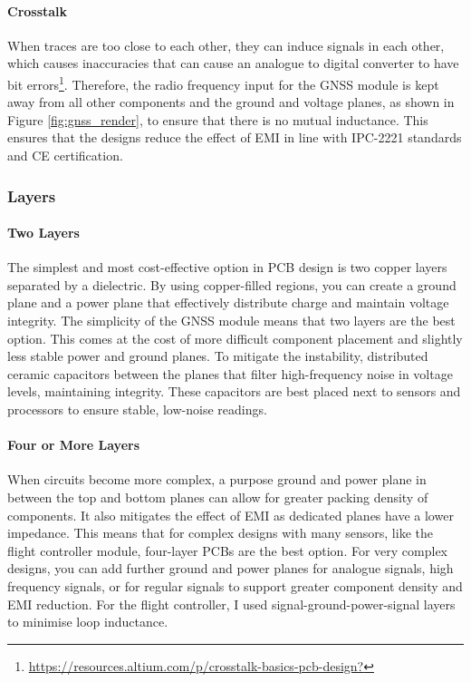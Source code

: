 \paragraph{Crosstalk}
When traces are too close to each other, they can induce signals in each other, which causes inaccuracies that can cause an analogue to digital converter to have bit errors\footnote{\url{https://resources.altium.com/p/crosstalk-basics-pcb-design?}}. Therefore, the radio frequency input for the \gls{GNSS} module is kept away from all other components and the ground and voltage planes, as shown in Figure \ref{fig:gnss_render}, to ensure that there is no mutual inductance. This ensures that the designs reduce the effect of \gls{EMI} in line with IPC-2221 standards and CE certification.

\subsubsection{Layers}\label{sub_sub_section:tgt_layers}
\paragraph{Two Layers}
The simplest and most cost-effective option in \gls{PCB} design is two copper layers separated by a dielectric. By using copper-filled regions, you can create a ground plane and a power plane that effectively distribute charge and maintain voltage integrity. The simplicity of the \gls{GNSS} module means that two layers are the best option. This comes at the cost of more difficult component placement and slightly less stable power and ground planes. To mitigate the instability, distributed ceramic capacitors between the planes that filter high-frequency noise in voltage levels, maintaining integrity. These capacitors are best placed next to sensors and processors to ensure stable, low-noise readings.
\paragraph{Four or More Layers}
When circuits become more complex, a purpose ground and power plane in between the top and bottom planes can allow for greater packing density of components. It also mitigates the effect of \gls{EMI} as dedicated planes have a lower impedance. This means that for complex designs with many sensors, like the flight controller module, four-layer \gls{PCB}s are the best option. For very complex designs, you can add further ground and power planes for analogue signals, high frequency signals, or for regular signals to support greater component density and \gls{EMI} reduction. For the flight controller, I used signal-ground-power-signal layers to minimise loop inductance.

